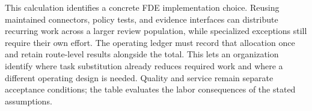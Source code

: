 This calculation identifies a concrete FDE implementation choice. Reusing maintained
connectors, policy tests, and evidence interfaces can distribute recurring work across a
larger review population, while specialized exceptions still require their own effort.
The operating ledger must record that allocation once and retain route-level results alongside
the total. This lets an organization identify where task substitution already reduces required
work and where a different operating design is needed. Quality and service remain separate
acceptance conditions; the table evaluates the labor consequences of the stated assumptions.

